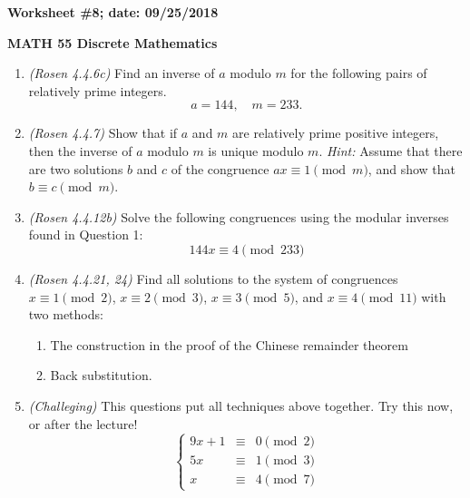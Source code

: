 \documentclass{article}
\begin{document}
{\bf Worksheet \#8; date: 09/25/2018}

{\bf MATH 55 Discrete Mathematics}

\begin{enumerate}
\item {\em (Rosen 4.4.6c)} Find an inverse of $a$ modulo $m$ for the following pairs of relatively prime integers.
\[
a = 144, \quad m = 233.
\]

\item {\em (Rosen 4.4.7)} Show that if $a$ and $m$ are relatively prime positive integers, then the inverse of $a$ modulo $m$ is unique modulo $m$. {\em Hint:} Assume that there are two solutions $b$ and $c$ of the congruence $ax \equiv 1 \pmod{m}$, and show that $b \equiv c \pmod{m}$.

\item {\em (Rosen 4.4.12b)} Solve the following congruences using the modular inverses found in Question 1:
\[
144x \equiv 4 \pmod{233}
\]

\item {\em (Rosen 4.4.21, 24)} Find all solutions to the system of congruences $x \equiv 1 \pmod{2}$, $x \equiv 2 \pmod{3}$, $x \equiv 3 \pmod{5}$, and $x \equiv 4 \pmod{11}$ with two methods:
\begin{enumerate}
\item The construction in the proof of the Chinese remainder theorem
\item Back substitution.
\end{enumerate}

\item {\em (Challeging)} This questions put all techniques above together. Try this now, or after the lecture!
\[
\left\{
\begin{array}{rcl}
9x + 1 &\equiv& 0 \pmod{2} \\
5x &\equiv& 1 \pmod{3} \\
x &\equiv& 4 \pmod{7}
\end{array}
\right.
\]
\end{enumerate}
\end{document}

